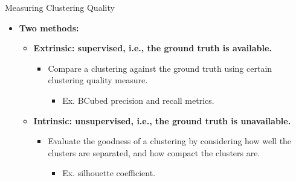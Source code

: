 \begin{frame}{Measuring Clustering Quality}
	\begin{itemize}
		\item \textbf{Two methods:}
		\begin{itemize}
			\item \textbf{{\color{airforceblue}Extrinsic}: supervised, i.e., 
			the ground truth is available.}
			\begin{itemize}
				\item Compare a clustering against the ground truth using 
				certain clustering quality measure.
				\begin{itemize}
					\item Ex. BCubed precision and recall metrics.
				\end{itemize}
			\end{itemize}
			\item \textbf{{\color{airforceblue}Intrinsic}: unsupervised, i.e., 
			the ground truth is unavailable.}
			\begin{itemize}
				\item Evaluate the goodness of a clustering by considering how 
				well the clusters are separated, and how compact the clusters 
				are.
				\begin{itemize}
					\item Ex. silhouette coefficient.
				\end{itemize}
			\end{itemize}
		\end{itemize}
	\end{itemize}
\end{frame}

